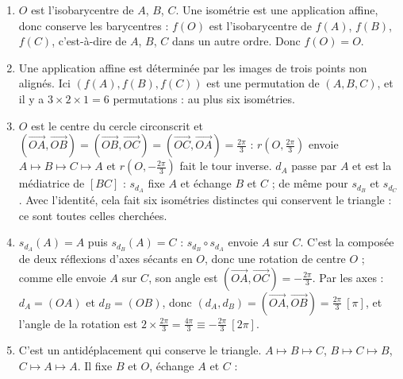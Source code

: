 \begin{corrige}
\begin{sol}
\begin{enumerate}
\begin{enumerate}
            \end{enumerate}
\end{enumerate}
\end{sol}
\begin{sol}
\begin{enumerate}
      \item $O$ est l'isobarycentre de $A$, $B$, $C$. Une isométrie est une application affine, donc conserve les barycentres :
            $f(O)$ est l'isobarycentre de $f(A)$, $f(B)$, $f(C)$, c'est-à-dire de $A$, $B$, $C$ dans un autre ordre. Donc $f(O) = O$.
      \item Une application affine est déterminée par les images de trois points non alignés. Ici $(f(A),f(B),f(C))$ est une permutation de $(A,B,C)$,
            et il y a $3 \times 2 \times 1 = 6$ permutations : au plus six isométries.
      \item $O$ est le centre du cercle circonscrit et $(\overrightarrow{OA},\overrightarrow{OB}) = (\overrightarrow{OB},\overrightarrow{OC}) = (\overrightarrow{OC},\overrightarrow{OA}) = \frac{2\pi}{3}$ :
            $r(O,\frac{2\pi}{3})$ envoie $A \mapsto B \mapsto C \mapsto A$ et $r(O,-\frac{2\pi}{3})$ fait le tour inverse.
            $d_A$ passe par $A$ et est la médiatrice de $[BC]$ : $s_{d_A}$ fixe $A$ et échange $B$ et $C$ ; de même pour $s_{d_B}$ et $s_{d_C}$.
            Avec l'identité, cela fait six isométries distinctes qui conservent le triangle : ce sont toutes celles cherchées.
      \item $s_{d_A}(A) = A$ puis $s_{d_B}(A) = C$ : $s_{d_B} \circ s_{d_A}$ envoie $A$ sur $C$.
            C'est la composée de deux réflexions d'axes sécants en $O$, donc une rotation de centre $O$ ; comme elle envoie $A$ sur $C$,
            son angle est $(\overrightarrow{OA},\overrightarrow{OC}) = -\frac{2\pi}{3}$.
            Par les axes : $d_A = (OA)$ et $d_B = (OB)$, donc $(d_A,d_B) = (\overrightarrow{OA},\overrightarrow{OB}) = \frac{2\pi}{3}\ [\pi]$,
            et l'angle de la rotation est $2 \times \frac{2\pi}{3} = \frac{4\pi}{3} \equiv -\frac{2\pi}{3}\ [2\pi]$. 
      \item C'est un antidéplacement qui conserve le triangle. $A \mapsto B \mapsto C$, $B \mapsto C \mapsto B$, $C \mapsto A \mapsto A$.
            Il fixe $B$ et $O$, échange $A$ et $C$ : 

\end{enumerate}
\end{sol}
\end{corrige}
